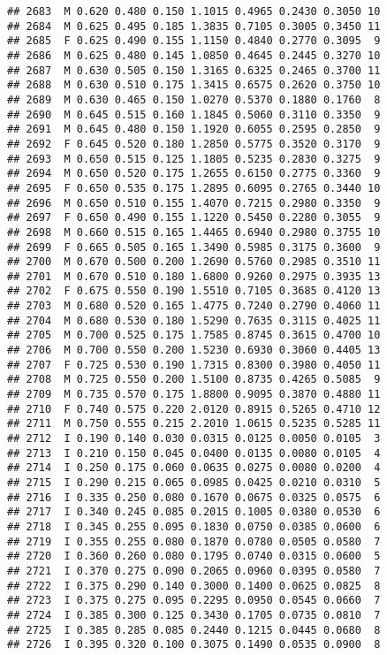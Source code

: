 \documentclass[
]{article}
\begin{document}
\begin{verbatim}
## 2683  M 0.620 0.480 0.150 1.1015 0.4965 0.2430 0.3050 10
## 2684  M 0.625 0.495 0.185 1.3835 0.7105 0.3005 0.3450 11
## 2685  F 0.625 0.490 0.155 1.1150 0.4840 0.2770 0.3095  9
## 2686  M 0.625 0.480 0.145 1.0850 0.4645 0.2445 0.3270 10
## 2687  M 0.630 0.505 0.150 1.3165 0.6325 0.2465 0.3700 11
## 2688  M 0.630 0.510 0.175 1.3415 0.6575 0.2620 0.3750 10
## 2689  M 0.630 0.465 0.150 1.0270 0.5370 0.1880 0.1760  8
## 2690  M 0.645 0.515 0.160 1.1845 0.5060 0.3110 0.3350  9
## 2691  M 0.645 0.480 0.150 1.1920 0.6055 0.2595 0.2850  9
## 2692  F 0.645 0.520 0.180 1.2850 0.5775 0.3520 0.3170  9
## 2693  M 0.650 0.515 0.125 1.1805 0.5235 0.2830 0.3275  9
## 2694  M 0.650 0.520 0.175 1.2655 0.6150 0.2775 0.3360  9
## 2695  F 0.650 0.535 0.175 1.2895 0.6095 0.2765 0.3440 10
## 2696  M 0.650 0.510 0.155 1.4070 0.7215 0.2980 0.3350  9
## 2697  F 0.650 0.490 0.155 1.1220 0.5450 0.2280 0.3055  9
## 2698  M 0.660 0.515 0.165 1.4465 0.6940 0.2980 0.3755 10
## 2699  F 0.665 0.505 0.165 1.3490 0.5985 0.3175 0.3600  9
## 2700  M 0.670 0.500 0.200 1.2690 0.5760 0.2985 0.3510 11
## 2701  M 0.670 0.510 0.180 1.6800 0.9260 0.2975 0.3935 13
## 2702  F 0.675 0.550 0.190 1.5510 0.7105 0.3685 0.4120 13
## 2703  M 0.680 0.520 0.165 1.4775 0.7240 0.2790 0.4060 11
## 2704  M 0.680 0.530 0.180 1.5290 0.7635 0.3115 0.4025 11
## 2705  M 0.700 0.525 0.175 1.7585 0.8745 0.3615 0.4700 10
## 2706  M 0.700 0.550 0.200 1.5230 0.6930 0.3060 0.4405 13
## 2707  F 0.725 0.530 0.190 1.7315 0.8300 0.3980 0.4050 11
## 2708  M 0.725 0.550 0.200 1.5100 0.8735 0.4265 0.5085  9
## 2709  M 0.735 0.570 0.175 1.8800 0.9095 0.3870 0.4880 11
## 2710  F 0.740 0.575 0.220 2.0120 0.8915 0.5265 0.4710 12
## 2711  M 0.750 0.555 0.215 2.2010 1.0615 0.5235 0.5285 11
## 2712  I 0.190 0.140 0.030 0.0315 0.0125 0.0050 0.0105  3
## 2713  I 0.210 0.150 0.045 0.0400 0.0135 0.0080 0.0105  4
## 2714  I 0.250 0.175 0.060 0.0635 0.0275 0.0080 0.0200  4
## 2715  I 0.290 0.215 0.065 0.0985 0.0425 0.0210 0.0310  5
## 2716  I 0.335 0.250 0.080 0.1670 0.0675 0.0325 0.0575  6
## 2717  I 0.340 0.245 0.085 0.2015 0.1005 0.0380 0.0530  6
## 2718  I 0.345 0.255 0.095 0.1830 0.0750 0.0385 0.0600  6
## 2719  I 0.355 0.255 0.080 0.1870 0.0780 0.0505 0.0580  7
## 2720  I 0.360 0.260 0.080 0.1795 0.0740 0.0315 0.0600  5
## 2721  I 0.370 0.275 0.090 0.2065 0.0960 0.0395 0.0580  7
## 2722  I 0.375 0.290 0.140 0.3000 0.1400 0.0625 0.0825  8
## 2723  I 0.375 0.275 0.095 0.2295 0.0950 0.0545 0.0660  7
## 2724  I 0.385 0.300 0.125 0.3430 0.1705 0.0735 0.0810  7
## 2725  I 0.385 0.285 0.085 0.2440 0.1215 0.0445 0.0680  8
## 2726  I 0.395 0.320 0.100 0.3075 0.1490 0.0535 0.0900  8

\end{verbatim}
\end{document}
